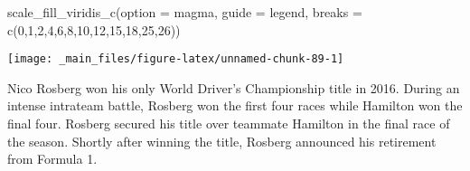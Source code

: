 \documentclass[
]{book}
\newenvironment{Shaded}{\begin{snugshade}}{\end{snugshade}}
\newcommand{\AttributeTok}[1]{\textcolor[rgb]{0.77,0.63,0.00}{#1}}
\newcommand{\DecValTok}[1]{\textcolor[rgb]{0.00,0.00,0.81}{#1}}
\newcommand{\FunctionTok}[1]{\textcolor[rgb]{0.00,0.00,0.00}{#1}}
\newcommand{\NormalTok}[1]{#1}
\newcommand{\StringTok}[1]{\textcolor[rgb]{0.31,0.60,0.02}{#1}}
\begin{document}
\begin{Shaded}
\begin{Highlighting}[]
  \FunctionTok{scale\_fill\_viridis\_c}\NormalTok{(}\AttributeTok{option =} \StringTok{\textquotesingle{}magma\textquotesingle{}}\NormalTok{,}
                       \AttributeTok{guide =} \StringTok{\textquotesingle{}legend\textquotesingle{}}\NormalTok{,}
                       \AttributeTok{breaks =} \FunctionTok{c}\NormalTok{(}\DecValTok{0}\NormalTok{,}\DecValTok{1}\NormalTok{,}\DecValTok{2}\NormalTok{,}\DecValTok{4}\NormalTok{,}\DecValTok{6}\NormalTok{,}\DecValTok{8}\NormalTok{,}\DecValTok{10}\NormalTok{,}\DecValTok{12}\NormalTok{,}\DecValTok{15}\NormalTok{,}\DecValTok{18}\NormalTok{,}\DecValTok{25}\NormalTok{,}\DecValTok{26}\NormalTok{))}
\end{Highlighting}
\end{Shaded}

\begin{center}\texttt{[image: \_main\_files/figure-latex/unnamed-chunk-89-1]} \end{center}

Nico Rosberg won his only World Driver's Championship title in 2016. During an intense intrateam battle, Rosberg won the first four races while Hamilton won the final four. Rosberg secured his title over teammate Hamilton in the final race of the season. Shortly after winning the title, Rosberg announced his retirement from Formula 1.
\end{document}
